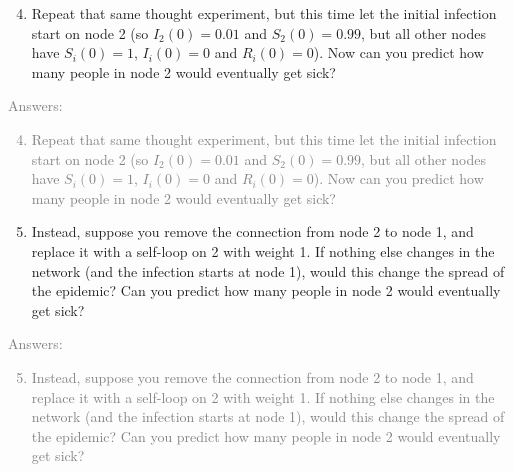 \documentclass[11pt]{article}
\begin{document}
\begin{enumerate}
	\setcounter{enumi}{3}
	\item Repeat that same thought experiment, but this time let the initial infection start on node 2 (so $I_2(0) = 0.01$ and $S_2(0) = 0.99$, but all other nodes have $S_i(0)=1$, $I_i(0)=0$  and $R_i(0)=0$). Now can you predict how many people in node 2 would eventually get sick?
\end{enumerate}
\textcolor{gray}{
Answers:
\begin{enumerate}
	\setcounter{enumi}{3}
	\item Repeat that same thought experiment, but this time let the initial infection start on node 2 (so $I_2(0) = 0.01$ and $S_2(0) = 0.99$, but all other nodes have $S_i(0)=1$, $I_i(0)=0$  and $R_i(0)=0$). Now can you predict how many people in node 2 would eventually get sick?
\end{enumerate}
}

\begin{enumerate}
	\setcounter{enumi}{4}
	\item Instead, suppose you remove the connection from node 2 to node 1, and replace it with a self-loop on 2 with weight 1. If nothing else changes in the network (and the infection starts at node 1), would this change the spread of the epidemic? Can you predict how many people in node 2 would eventually get sick?
\end{enumerate}
\textcolor{gray}{
Answers:
\begin{enumerate}
	\setcounter{enumi}{4}
	\item Instead, suppose you remove the connection from node 2 to node 1, and replace it with a self-loop on 2 with weight 1. If nothing else changes in the network (and the infection starts at node 1), would this change the spread of the epidemic? Can you predict how many people in node 2 would eventually get sick?
\end{enumerate}
}
\end{document}
